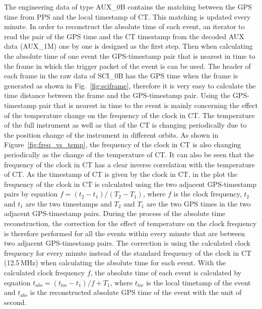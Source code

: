\documentclass{raa}
\begin{document}
The engineering data of type AUX\_0B contains the matching between the GPS time from PPS and the local timestamp of CT. This matching is updated every minute. In order to reconstruct the absolute time of each event, an iterator to read the pair of the GPS time and the CT timestamp from the decoded AUX data (AUX\_1M) one by one is designed as the first step. Then when calculating the absolute time of one event the GPS-timestamp pair that is nearest in time to the frame in which the trigger packet of the event is can be used. The header of each frame in the raw data of SCI\_0B has the GPS time when the frame is generated as shown in Fig.~\ref{fig:sciframe}, therefore it is very easy to calculate the time distance between the frame and the GPS-timestamp pair. Using the GPS-timestamp pair that is nearest in time to the event is mainly concerning the effect of the temperature change on the frequency of the clock in CT. The temperature of the full instrument as well as that of the CT is changing periodically due to the position change of the instrument in different orbits. As shown in Figure~\ref{fig:freq_vs_temp}, the frequency of the clock in CT is also changing periodically as the change of the temperature of CT. It can also be seen that the frequency of the clock in CT has a clear inverse correlation with the temperature of CT. As the timestamp of CT is given by the clock in CT, in the plot the frequency of the clock in CT is calculated using the two adjacent GPS-timestamp pairs by equation $f = (t_2 - t_1) / (T_2 - T_1)$, where $f$ is the clock frequency, $t_2$ and $t_1$ are the two timestamps and $T_2$ and $T_1$ are the two GPS times in the two adjacent GPS-timestamp pairs. During the process of the absolute time reconstruction, the correction for the effect of temperature on the clock frequency is therefore performed for all the events within every minute that are between two adjacent GPS-timestamp pairs. The correction is using the calculated clock frequency for every minute instead of the standard frequency of the clock in CT (12.5\,MHz) when calculating the absolute time for each event. With the calculated clock frequency $f$, the absolute time of each event is calculated by equation $t_{abs} = (t_{loc} - t_1) / f + T_1$, where $t_{loc}$ is the local timetamp of the event and $t_{abs}$ is the reconstructed absolute GPS time of the event with the unit of second.
\end{document}

